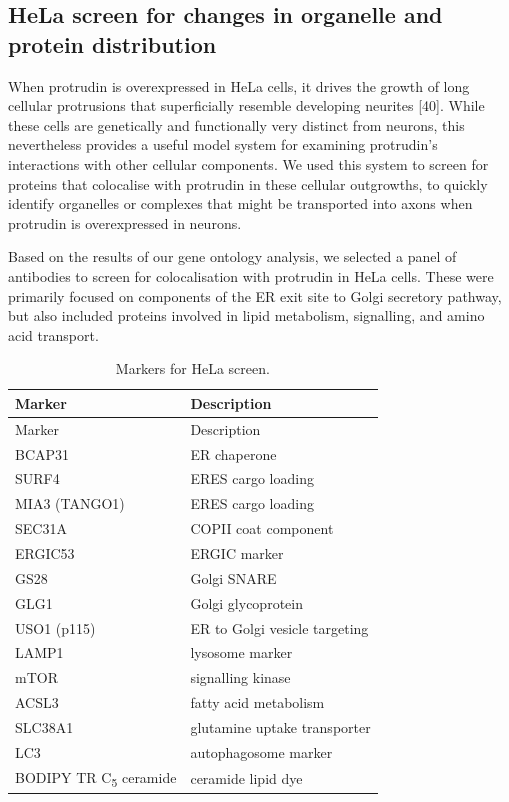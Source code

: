 \documentclass[
  12pt,
  a4paper,
]{book}
\begin{document}
\hypertarget{hela-screen-for-changes-in-organelle-and-protein-distribution}{%
\subsection{HeLa screen for changes in organelle and protein distribution}\label{hela-screen-for-changes-in-organelle-and-protein-distribution}}

When protrudin is overexpressed in HeLa cells, it drives the growth of long cellular protrusions that superficially resemble developing neurites {[}40{]}. While these cells are genetically and functionally very distinct from neurons, this nevertheless provides a useful model system for examining protrudin's interactions with other cellular components. We used this system to screen for proteins that colocalise with protrudin in these cellular outgrowths, to quickly identify organelles or complexes that might be transported into axons when protrudin is overexpressed in neurons.

Based on the results of our gene ontology analysis, we selected a panel of antibodies to screen for colocalisation with protrudin in HeLa cells. These were primarily focused on components of the ER exit site to Golgi secretory pathway, but also included proteins involved in lipid metabolism, signalling, and amino acid transport.

\begin{longtable}[]{@{}ll@{}}
\caption{\label{tab:unnamed-chunk-1}Markers for HeLa screen.}\tabularnewline
\toprule()
Marker & Description \\
\midrule()
\endfirsthead
\toprule()
Marker & Description \\
\midrule()
\endhead
BCAP31 & ER chaperone \\
SURF4 & ERES cargo loading \\
MIA3 (TANGO1) & ERES cargo loading \\
SEC31A & COPII coat component \\
ERGIC53 & ERGIC marker \\
GS28 & Golgi SNARE \\
GLG1 & Golgi glycoprotein \\
USO1 (p115) & ER to Golgi vesicle targeting \\
LAMP1 & lysosome marker \\
mTOR & signalling kinase \\
ACSL3 & fatty acid metabolism \\
SLC38A1 & glutamine uptake transporter \\
LC3 & autophagosome marker \\
BODIPY TR C\textsubscript{5} ceramide & ceramide lipid dye \\
\bottomrule()
\end{longtable}
\end{document}
